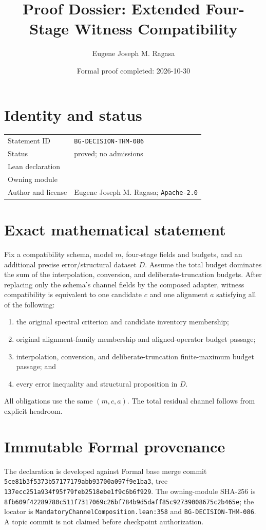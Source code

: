 \documentclass[10pt]{article}
\title{Proof Dossier: Extended Four-Stage Witness Compatibility}
\author{Eugene Joseph M. Ragasa}
\date{Formal proof completed: 2026-10-30}
\begin{document}
\raggedright
\maketitle
\section{Identity and status}
\begin{tabularx}{\textwidth}{@{}lY@{}}
\toprule
Statement ID & \texttt{BG-DECISION-THM-086} \\
Status & proved; no admissions \\
Lean declaration &  \\
Owning module &  \\
Author and license & Eugene Joseph M. Ragasa; \texttt{Apache-2.0} \\
\bottomrule
\end{tabularx}

\section{Exact mathematical statement}
Fix a compatibility schema, model $m$, four-stage fields and budgets, and an additional precise
error/structural dataset $D$. Assume the total budget dominates the sum of the interpolation,
conversion, and deliberate-truncation budgets. After replacing only the schema's channel fields by
the composed adapter, witness compatibility is equivalent to one candidate $c$ and one alignment
$a$ satisfying all of the following:
\begin{enumerate}
\item the original spectral criterion and candidate inventory membership;
\item original alignment-family membership and aligned-operator budget passage;
\item interpolation, conversion, and deliberate-truncation finite-maximum budget passage; and
\item every error inequality and structural proposition in $D$.
\end{enumerate}
All obligations use the same $(m,c,a)$. The total residual channel follows from explicit headroom.

\section{Immutable Formal provenance}
The declaration is developed against Formal base merge commit
\texttt{5ce81b3f5373b57177179abb93700a097f9e1ba3}, tree
\texttt{137ecc251a934f95f79feb2518ebe1f9c6b6f929}. The owning-module SHA-256 is
\texttt{8fb609f42289780c511f7317069c26bf784b9d5daff85c92739008675c2b465e}; the locator is
\texttt{MandatoryChannelComposition.lean:358} and \texttt{BG-DECISION-THM-086}. A topic commit
is not claimed before checkpoint authorization.
\end{document}
